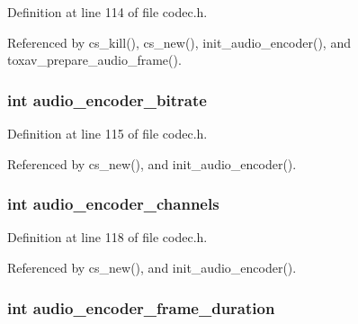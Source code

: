 Definition at line 114 of file codec.\+h.



Referenced by cs\+\_\+kill(), cs\+\_\+new(), init\+\_\+audio\+\_\+encoder(), and toxav\+\_\+prepare\+\_\+audio\+\_\+frame().

\hypertarget{struct___c_s_session_a8951572b99eec737269f5de96f9c5320}{
\subsubsection[{audio\+\_\+encoder\+\_\+bitrate}]{\setlength{\rightskip}{0pt plus 5cm}int audio\+\_\+encoder\+\_\+bitrate}}\label{struct___c_s_session_a8951572b99eec737269f5de96f9c5320}


Definition at line 115 of file codec.\+h.



Referenced by cs\+\_\+new(), and init\+\_\+audio\+\_\+encoder().

\hypertarget{struct___c_s_session_a8ee56e2e7543722415f21dcc3ace1899}{
\subsubsection[{audio\+\_\+encoder\+\_\+channels}]{\setlength{\rightskip}{0pt plus 5cm}int audio\+\_\+encoder\+\_\+channels}}\label{struct___c_s_session_a8ee56e2e7543722415f21dcc3ace1899}


Definition at line 118 of file codec.\+h.



Referenced by cs\+\_\+new(), and init\+\_\+audio\+\_\+encoder().

\hypertarget{struct___c_s_session_a25f8c6ef812a7edaaadb81b41f8d818d}{
\subsubsection[{audio\+\_\+encoder\+\_\+frame\+\_\+duration}]{\setlength{\rightskip}{0pt plus 5cm}int audio\+\_\+encoder\+\_\+frame\+\_\+duration}}\label{struct___c_s_session_a25f8c6ef812a7edaaadb81b41f8d818d}


